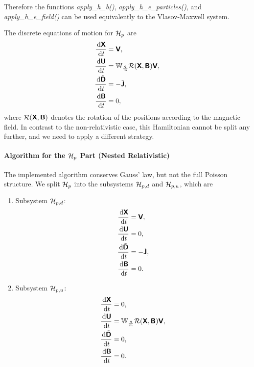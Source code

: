 \documentclass[11pt]{article}
\begin{document}
Therefore the functions \emph{apply_h_b()}, \emph{apply_h_e_particles()}, and \emph{apply_h_e_field()} can be used equivalently to the Vlasov-Maxwell system.

The discrete equations of motion for $\mathcal{H}_p$ are
$$
    \begin{aligned}
                  \frac{\, {\rm d} {\boldsymbol {\rm \mathsf{X}}}}{\, {\rm d} t}         & = {\boldsymbol {\rm \mathsf{V}}},                                 \\
                  \frac{\, {\rm d} {\boldsymbol {\rm \mathsf{U}}} }{\, {\rm d} t}        & = \mathbb{W}_{\frac{q}{m}} \mathcal{R}({\boldsymbol {\rm \mathsf{X}}}, {\boldsymbol {\rm \mathsf{B}}}){\boldsymbol {\rm \mathsf{V}}}, \\
                  \frac{\, {\rm d} \tilde{{\boldsymbol {\rm \mathsf{D}}}}}{\, {\rm d} t} & =  -\tilde{{\boldsymbol {\rm \mathsf{J}}}},                       \\
                  \frac{\, {\rm d} {\boldsymbol {\rm \mathsf{B}}} }{\, {\rm d} t}        & = 0,
    \end{aligned}
$$
where $\mathcal{R}({\boldsymbol {\rm \mathsf{X}}}, {\boldsymbol {\rm \mathsf{B}}})$ denotes the rotation of the positions according to the magnetic field.
In contrast to the non-relativistic case, this Hamiltonian cannot be split any further, and we need to apply a different strategy. 

\paragraph{Algorithm for the $\mathcal{H}_p$ Part (Nested Relativistic)}
The implemented algorithm conserves Gauss' law, but not the full Poisson structure. We split $\mathcal{H}_p$ into the subsystems $\mathcal{H}_{p,d}$ and $\mathcal{H}_{p,u}$, which are


\begin{enumerate}
    \item Subsystem $\mathcal{H}_{p,d}$:
          $$
              \begin{aligned}
                  \frac{\, {\rm d} {\boldsymbol {\rm \mathsf{X}}}}{\, {\rm d} t}         & = {\boldsymbol {\rm \mathsf{V}}},                                 \\
                  \frac{\, {\rm d} {\boldsymbol {\rm \mathsf{U}}} }{\, {\rm d} t}        & = 0,                                 \\
                  \frac{\, {\rm d} \tilde{{\boldsymbol {\rm \mathsf{D}}}}}{\, {\rm d} t} & =  -\tilde{{\boldsymbol {\rm \mathsf{J}}}}, \\
                  \frac{\, {\rm d} {\boldsymbol {\rm \mathsf{B}}} }{\, {\rm d} t}        & = 0.
              \end{aligned}
          $$
    \item Subsystem $\mathcal{H}_{p,u}$:
          $$
              \begin{aligned}
                  \frac{\, {\rm d} {\boldsymbol {\rm \mathsf{X}}}}{\, {\rm d} t}       & = 0,                          \\
                  \frac{\, {\rm d} {\boldsymbol {\rm \mathsf{U}}} }{\, {\rm d} t}        & = \mathbb{W}_{\frac{q}{m}} \mathcal{R}({\boldsymbol {\rm \mathsf{X}}}, {\boldsymbol {\rm \mathsf{B}}}){\boldsymbol {\rm \mathsf{V}}}, \\
                  \frac{\, {\rm d} \tilde{{\boldsymbol {\rm \mathsf{D}}}}}{\, {\rm d} t} & =  0,                         \\
                  \frac{\, {\rm d} {\boldsymbol {\rm \mathsf{B}}} }{\, {\rm d} t}      & = 0.
              \end{aligned}
          $$
    
\end{enumerate}
\end{document}
